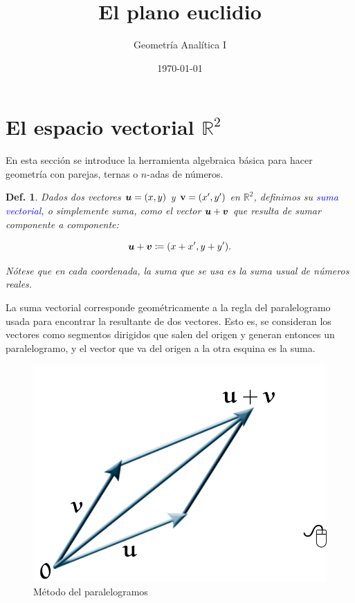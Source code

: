 \documentclass{article}
\title{\Huge{El plano euclidio}}
\author{Geometría Analítica I}
\date{\today}
\theoremstyle{definicion}
\newtheorem{definicion}{Def.}
\theoremstyle{definition}             %
\theoremstyle{definition}             %
\theoremstyle{definition}
\theoremstyle{definition}
\theoremstyle{observacion}
\theoremstyle{definition}
\theoremstyle{plain}
\theoremstyle{definition}
\theoremstyle{afirmacion}
\theoremstyle{notation}
\theoremstyle{definition}
\begin{document}
    \maketitle

    \section{El espacio vectorial \texorpdfstring{\(\mathbb{R}^{2}\)}{ℝ²}}

    En esta sección se introduce la herramienta algebraica básica para hacer geometría con parejas, ternas o \(n\)-adas de números.

    \begin{definicion}
        Dados dos vectores \(\vb*{u} = (x, y)\) y \(\vb{v} = (x^{\prime}, y^{\prime})\) en \(\mathbb{R}^{2}\), definimos su \textcolor{blue}{suma vectorial}, o simplemente suma, como el vector \(\vb*{u} + \vb*{v}\) que resulta de sumar componente a componente:

        \begin{equation*}
            \vb*{u} + \vb*{v} \coloneq (x + x^{\prime}, y + y^{\prime}).
        \end{equation*}

        Nótese que en cada coordenada, la suma que se usa es la suma usual de números reales.
    \end{definicion}

    La suma vectorial corresponde geométricamente a la regla del paralelogramo usada para encontrar la resultante de dos vectores. Esto es, se consideran los vectores como segmentos dirigidos que salen del origen y generan entonces un paralelogramo, y el vector que va del origen a la otra esquina es la suma.
    
    \begin{figure}[htb]
        \centering
        \includegraphics[scale=0.2]{1}
        \caption{Método del paralelogramos}
        \label{fig:paralelogramo}
    \end{figure}
\end{document}
